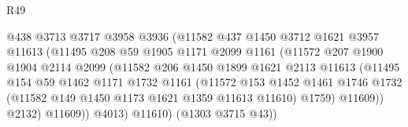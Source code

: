 \begin{lexlean}{R49}
\begin{coremodule}
                                    @438
                                    @3713
                                    @3717
                                    @3958
                                    @3936
                                    (@11582
                                      @437
                                      @1450
                                      @3712
                                      @1621
                                      @3957
                                      @11613
                                      (@11495
                                        @208
                                        @59
                                        @1905
                                        @1171
                                        @2099
                                        @1161
                                        (@11572
                                          @207
                                          @1900
                                          @1904
                                          @2114
                                          @2099
                                          (@11582
                                            @206
                                            @1450
                                            @1899
                                            @1621
                                            @2113
                                            @11613
                                            (@11495
                                              @154
                                              @59
                                              @1462
                                              @1171
                                              @1732
                                              @1161
                                              (@11572
                                                @153
                                                @1452
                                                @1461
                                                @1746
                                                @1732
                                                (@11582 @149 @1450 @1173 @1621 @1359 @11613 @11610)
                                                @1759)
                                              @11609))
                                          @2132)
                                        @11609))
                                    @4013)
                                  @11610)
                                (@1303 @3715 @43))

\end{coremodule}
\end{lexlean}
